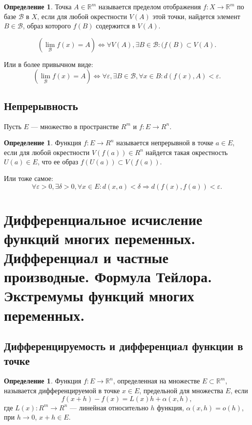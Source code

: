 \documentclass[12pt]{report}
\theoremstyle{definition}
\newtheorem{definition}[theorem]{Определение}
\newcommand{\R}{\mathbb R}
\newcommand{\B}{\mathcal B}
\begin{document}
\begin{definition}
Точка $A \in \R^m$ называется пределом отображения $f: X \rightarrow \R^m$
по базе $\B$ в $X$, если для любой окрестности $V(A)$ этой точки, найдется элемент
$B \in \B$, образ которого $f(B)$ содержится в $V(A)$.
\end{definition}

$$
(\lim\limits_{\B} f(x) = A) \Leftrightarrow \forall V(A), \exists B \in \B: (f(B) \subset V(A).
$$

Или в более привычном виде:
$$
(\lim\limits_{\B} f(x) = A) \Leftrightarrow \forall \varepsilon, \exists B \in \B, \forall x \in B: d(f(x), A) < \varepsilon.
$$

\subsection{Непрерывность}
Пусть $E$ --- множество в пространстве $R^m$ и $f: E \rightarrow R^n$.

\begin{definition}
Функция $f: E \rightarrow R^n$ называется непрерывной в точке $a \in E$,
если для любой окрестности $V(f(a)) \in R^n$ найдется такая окрестность
$U(a) \in E$, что ее образ $f(U(a)) \subset V(f(a))$.
\end{definition}

Или тоже самое:
$$
\forall \varepsilon > 0, \exists \delta > 0, \forall x \in E: d(x, a) < \delta \Rightarrow d(f(x), f(a)) < \varepsilon.
$$


\section
{
  Дифференциальное исчисление функций многих переменных.
  Дифференциал и частные производные. Формула Тейлора.
  Экстремумы функций многих переменных.
}

\subsection{Дифференцируемость и дифференциал функции в точке}
\begin{definition}
Функция $f: E \rightarrow \R^n$, определенная на множестве $E \subset \R^m$,
называется дифференцируемой в точке $x \in E$, предельной для множества $E$,
если
$$
f(x + h) - f(x) = L(x)h + \alpha(x, h),
$$
где $L(x): R^m \rightarrow R^n$ --- линейная относительно $h$ функция,
$\alpha(x, h) = o(h)$, при $h\rightarrow 0$, $x + h \in E$.
\end{definition}
\end{document}
